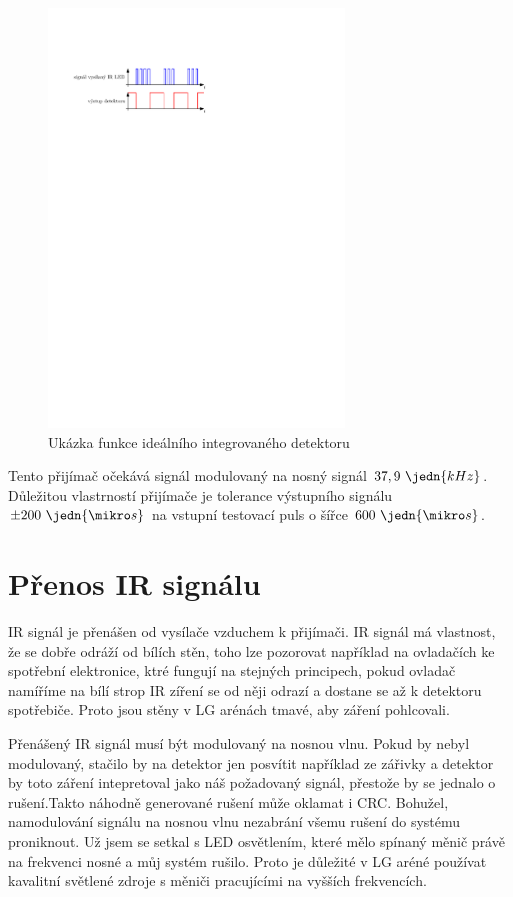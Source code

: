 \begin{figure}[H]
    \begin{center}
        \includegraphics[width=0.7\textwidth]{img/funkce-ir-detektoru}
    \end{center}
    \caption{Ukázka funkce ideálního integrovaného detektoru}
\end{figure}

Tento přijímač očekává signál modulovaný na nosný signál $37,9~\jedn{kHz}$. Důležitou vlastrností přijímače je tolerance výstupního signálu $\pm 200~\jedn{\mikro s}$ na vstupní testovací puls o šířce $600~\jedn{\mikro s}$.

\section{Přenos IR signálu}
IR signál je přenášen od vysílače vzduchem k přijímači. IR signál má vlastnost, že se dobře odráží od bílích stěn, toho lze pozorovat například na ovladačích ke spotřební elektronice, ktré fungují na stejných principech, pokud ovladač namíříme na bílí strop IR zíření se od něji odrazí a dostane se až k detektoru spotřebiče. Proto jsou stěny v LG arénách tmavé, aby záření pohlcovali.

Přenášený IR signál musí být modulovaný na nosnou vlnu. Pokud by nebyl modulovaný, stačilo by na detektor jen posvítit například ze zářivky a detektor by toto záření intepretoval jako náš požadovaný signál, přestože by se jednalo o rušení.Takto náhodně generované rušení může oklamat i CRC. Bohužel, namodulování signálu na nosnou vlnu nezabrání všemu rušení do systému proniknout. Už jsem se setkal s LED osvětlením, které mělo spínaný měnič právě na frekvenci nosné a můj systém rušilo. Proto je důležité v LG aréné používat kavalitní světlené zdroje s měniči pracujícími na vyšších frekvencích.


